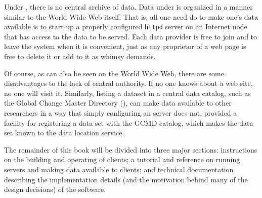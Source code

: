 Under \opendap, there is no central archive of data.  Data under \opendap
is organized in a manner similar to the World Wide Web itself.  That
is, all one need do to make one's data available is to start up a
properly configured {\tt httpd} server on an Internet node that has
access to the data to be served.  Each data provider is free to join
and to leave the system when it is convenient, just as any proprietor
of a web page is free to delete it or add to it as whimsy demands.

Of course, as can also be seen on the World Wide Web, there are some
disadvantages to the lack of central authority.  If no one knows about
a web site, no one will visit it.  Similarly, listing a dataset in a
central data catalog, such as the Global Change Master Directory
(),
can make data available to other researchers in a way that simply
configuring an \opendap server does not.  \opendap provided a facility for
registering a data set with the GCMD catalog, which makes the data set
known to the \opendap data location service.



The remainder of this book will be divided into three major sections:
instructions on the building and operating of \opendap clients; a tutorial
and reference on running \opendap servers and making data available to \opendap
clients; and technical documentation describing the implementation details
(and the motivation behind many of the design decisions) of the \opendap
software.



